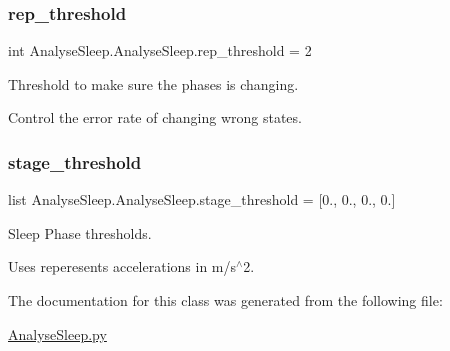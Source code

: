 \subsubsection{\texorpdfstring{rep\+\_\+threshold}{rep\_threshold}}
{\footnotesize\ttfamily int Analyse\+Sleep.\+Analyse\+Sleep.\+rep\+\_\+threshold = 2\hspace{0.3cm}{\ttfamily [static]}}



Threshold to make sure the phases is changing. 

Control the error rate of changing wrong states. \mbox{\label{class_analyse_sleep_1_1_analyse_sleep_a2629157f9258b573b5e7511f60f96d28}} 
\subsubsection{\texorpdfstring{stage\+\_\+threshold}{stage\_threshold}}
{\footnotesize\ttfamily list Analyse\+Sleep.\+Analyse\+Sleep.\+stage\+\_\+threshold = \mbox{[}0., 0., 0., 0.\mbox{]}\hspace{0.3cm}{\ttfamily [static]}}



Sleep Phase thresholds. 

Uses reperesents accelerations in m/s$^\wedge$2. 

The documentation for this class was generated from the following file\+:\begin{DoxyCompactItemize}
\item 
\mbox{\hyperlink{_analyse_sleep_8py}{Analyse\+Sleep.\+py}}\end{DoxyCompactItemize}
